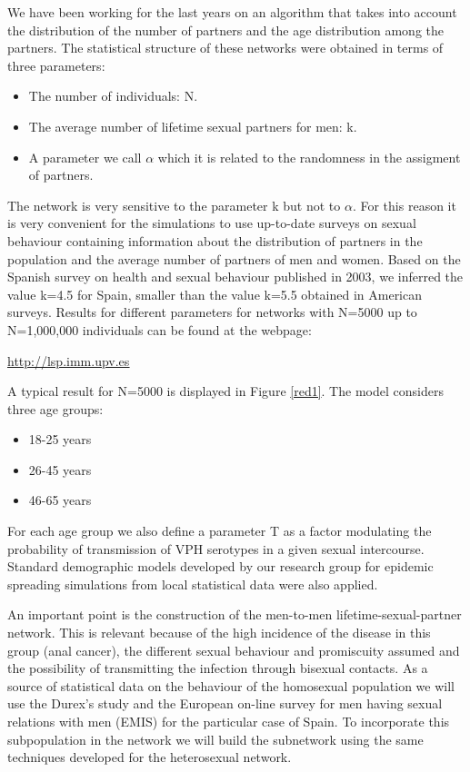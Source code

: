 We have been working for the last years on an algorithm that takes into account the distribution of the number of partners and the age distribution among the partners. The statistical structure of these networks were obtained in terms of three parameters:

\begin{itemize}
	\item The number of individuals: N.
	\item The average number of lifetime sexual partners for men: k.
	\item A parameter we call $\alpha$ which it is related to the randomness in the assigment of partners.
\end{itemize}

The network is very sensitive to the parameter k but not to $\alpha$. For this reason it is very convenient for the simulations to use up-to-date surveys on sexual behaviour containing information about the distribution of partners in the population and the average number of partners of men and women. Based on the Spanish survey on health and sexual behaviour published in 2003, we inferred the value k=4.5 for Spain, smaller than the value k=5.5 obtained in American surveys. Results for different parameters for networks with N=5000 up to N=1,000,000 individuals can be found at the webpage:
\begin{center}
	\underline{\url{http://lsp.imm.upv.es}}
\end{center}

A typical result for N=5000 is displayed in Figure \ref{red1}.
\newline
The model considers three age groups:
\begin{itemize}
	\item 18-25 years
	\item 26-45 years
	\item 46-65 years
\end{itemize}

For each age group we also define a parameter T as a factor modulating the probability of transmission of VPH serotypes in a given sexual intercourse.
Standard demographic models developed by our research group for epidemic spreading simulations from local statistical data were also applied.

An important point is the construction of the men-to-men lifetime-sexual-partner network. This is relevant because of the high incidence of the disease in this group (anal cancer), the different sexual behaviour and promiscuity assumed and the possibility of transmitting the infection through bisexual contacts. 
As a source of statistical data on the behaviour of the homosexual population we will use the Durex's study and the European on-line survey for men having sexual relations with men (EMIS) for the particular case of Spain.
To incorporate this subpopulation in the network we will build the subnetwork using the same techniques developed for the heterosexual network.

